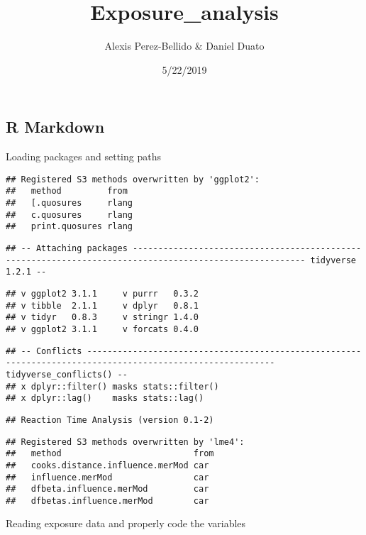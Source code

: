 \documentclass[]{article}
\title{Exposure\_analysis}
\author{Alexis Perez-Bellido \& Daniel Duato}
\date{5/22/2019}
\begin{document}
\maketitle

\hypertarget{r-markdown}{%
\subsection{R Markdown}\label{r-markdown}}

Loading packages and setting paths

\begin{verbatim}
## Registered S3 methods overwritten by 'ggplot2':
##   method         from 
##   [.quosures     rlang
##   c.quosures     rlang
##   print.quosures rlang
\end{verbatim}

\begin{verbatim}
## -- Attaching packages -------------------------------------------------------------------------------------------------------- tidyverse 1.2.1 --
\end{verbatim}

\begin{verbatim}
## v ggplot2 3.1.1     v purrr   0.3.2
## v tibble  2.1.1     v dplyr   0.8.1
## v tidyr   0.8.3     v stringr 1.4.0
## v ggplot2 3.1.1     v forcats 0.4.0
\end{verbatim}

\begin{verbatim}
## -- Conflicts ----------------------------------------------------------------------------------------------------------- tidyverse_conflicts() --
## x dplyr::filter() masks stats::filter()
## x dplyr::lag()    masks stats::lag()
\end{verbatim}

\begin{verbatim}
## Reaction Time Analysis (version 0.1-2)
\end{verbatim}

\begin{verbatim}
## Registered S3 methods overwritten by 'lme4':
##   method                          from
##   cooks.distance.influence.merMod car 
##   influence.merMod                car 
##   dfbeta.influence.merMod         car 
##   dfbetas.influence.merMod        car
\end{verbatim}

Reading exposure data and properly code the variables
\end{document}
